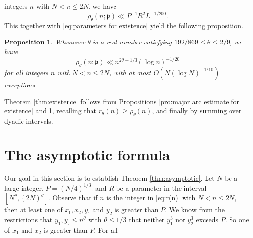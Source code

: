 \documentclass[12pt,english,reqno]{amsart}
\theoremstyle{definition}
\theoremstyle{remark}
\numberwithin{equation}{section}
\numberwithin{equation}{section}
\numberwithin{figure}{section}
\theoremstyle{plain}
\theoremstyle{plain}
\newtheorem{prop}[thm]{Proposition}
\theoremstyle{plain}
\theoremstyle{plain}
\numberwithin{equation}{section}
\numberwithin{thm}{section}
\begin{document}
integers $n$ with $N<n\leq2N$, we have
\[
\rho_{\theta}(n;\mathfrak{p})\ll P^{-1}R^{2}L^{-1/200}.\]
This together with \eqref{eq:parameters for existence} yield the following proposition.
\begin{prop}
\label{pro:minor arc estimate for existence}Whenever $\theta$ is
a real number satisfying $192/869\leq\theta\leq2/9$, we have
\[
\rho_{\theta}(n;\mathfrak{p})\ll n^{2\theta-1/3}(\log n)^{-1/20}\]
for all integers $n$ with $N<n\leq2N$, with at most $O(N(\log N)^{-1/10})$
exceptions.
\end{prop}
Theorem \ref{thm:existence} follows from Propositions \ref{pro:major arc estimate for existence}
and \ref{pro:minor arc estimate for existence}, recalling that $r_{\theta}(n)\geq\rho_{\theta}(n)$,
and finally by summing over dyadic intervals.
\section{\label{sec:An-asymptotic-formula}The asymptotic formula}
Our goal in this section is to establish Theorem \ref{thm:asymptotic}. Let $N$ be a large integer, $P=(N/4)^{1/3}$, and $R$ be a parameter in the interval $[N^{\theta},(2N)^{\theta}]$. Observe that if $n$ is the integer in \eqref{eq:r(n)} with $N<n\leq2N$, then at least one of $x_{1},x_{2},y_{1}$ and $y_{2}$ is greater
than $P$. We know from the restrictions that $y_{1},y_{2}\leq n^{\theta}$
with $\theta\leq1/3$ that neither $y_{1}^{3}$ nor $y_{2}^{3}$ exceeds
$P$. So one of $x_{1}$ and $x_{2}$ is greater than $P$. For all
\end{document}
